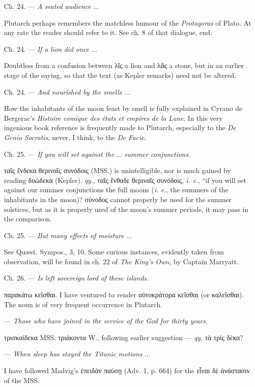 \documentclass[a4paper, 11pt, oneside, polutonikogreek, english]{article}
\begin{document}
Ch. 24. --- \emph{A seated audience} ...

Plutarch perhaps remembers the matchless humour of the \emph{Protagoras} of Plato. At any rate the reader should refer to it. See ch. 8 of that dialogue, end.

Ch. 24. --- \emph{If a lion did once} ...

Doubtless from a confusion between λῖς a lion and λᾶς a stone, but in an earlier stage of the saying, so that the text (as Kepler remarks) need not be altered.

Ch. 24. --- \emph{And nourished by the smells} ... 

How the inhabitants of the moon feast by smell is fully explained in Cyrano de Bergerac's \emph{Histoire comique des états et empires de la Lune}. In this very ingenious book reference is frequently made to Plutarch, especially to the \emph{De Genio Socratis}, never, I think, to the \emph{De Facie}.

Ch. 25. --- \emph{If you will set against the} ... \emph{summer conjunctions.}

ταῖς ἕνδεκα θεριναῖς συνόδοις (MSS.) is unintelligible, nor is much gained by reading δυώδεκα (Kepler). \emph{qy.}, ταῖς ἔνθαδε θεριναῖς συνόδοις, \emph{i. e.}, ``if you will set against our summer conjunctions the full moons (\emph{i. e.}, the summers of the inhabitants in the moon)? σύνοδος cannot properly be used for the summer solstices, but as it is properly used of the moon's summer periods, it may pass in the comparison.

Ch. 25. --- \emph{But many effects of moisture} ...

See Quæst. Sympos., 3, 10. Some curious instances, evidently taken from observation, will be found in ch. 22 of \emph{The King's Own}, by Captain Marryatt.

Ch. 26. --- \emph{Is left sovereign lord of these islands.}

παρακάτω κεῖσθαι. I have ventured to render αὐτοκράτορα κεῖσθαι (or καλεῖσθαι). The noun is of very frequent occurrence in Plutarch.

--- \emph{Those who have joined in the service of the God for thirty years.}

τρισκαίδεκα MSS. τριάκοντα W., following earlier suggestion --- \emph{qy.} τὰ τρὶς δέκα?

--- \emph{When sleep has stayed the Titanic motions} ...

I have followed Madvig's ἐπειδὰν παύσῃ (Adv. 1, p. 664) for the εἶναι δὲ ἀνάστασιν of the MSS.
\end{document}
